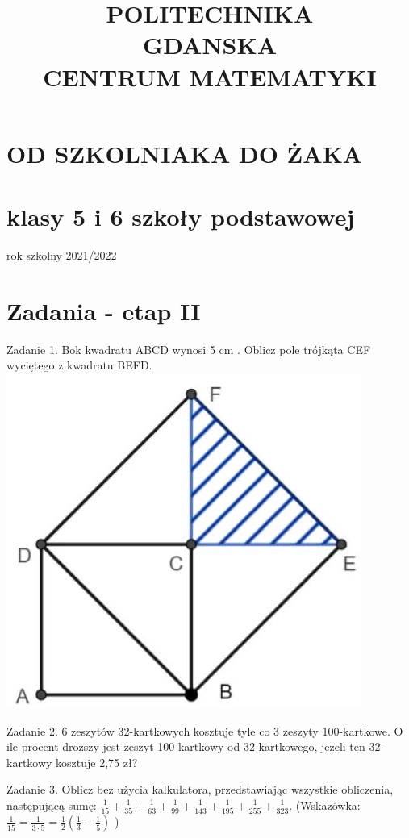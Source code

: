 \documentclass[10pt]{article}
\title{POLITECHNIKA \\
 GDANSKA \\
 CENTRUM MATEMATYKI }
\author{}
\date{}
\begin{document}
\maketitle
\section*{OD SZKOLNIAKA DO ŻAKA}
\section*{klasy 5 i 6 szkoły podstawowej}
rok szkolny 2021/2022

\section*{Zadania - etap II}
Zadanie 1. Bok kwadratu ABCD wynosi 5 cm . Oblicz pole trójkąta CEF wyciętego z kwadratu BEFD.\\
\includegraphics[max width=\textwidth, center]{2024_11_21_c6672992d8aeb6aa1085g-1(1)}

Zadanie 2. 6 zeszytów 32-kartkowych kosztuje tyle co 3 zeszyty 100-kartkowe. O ile procent droższy jest zeszyt 100-kartkowy od 32-kartkowego, jeżeli ten 32-kartkowy kosztuje 2,75 zł?

Zadanie 3. Oblicz bez użycia kalkulatora, przedstawiając wszystkie obliczenia, następującą sumę: \(\frac{1}{15}+\frac{1}{35}+\frac{1}{63}+\frac{1}{99}+\frac{1}{143}+\frac{1}{195}+\frac{1}{255}+\frac{1}{323}\). (Wskazówka: \(\frac{1}{15}=\frac{1}{3 \cdot 5}=\frac{1}{2}\left(\frac{1}{3}-\frac{1}{5}\right)\) )
\end{document}
